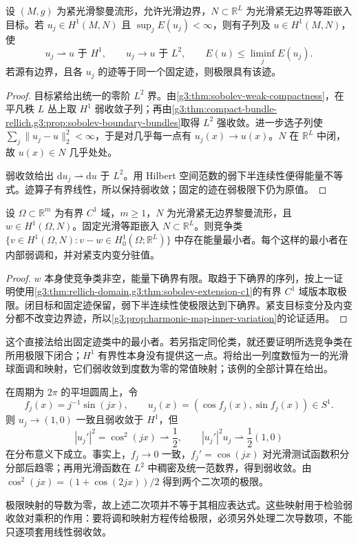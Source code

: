 \begin{theorem}\label{g3:thm:sobolev-map-weak-closure}
	设 \((M,g)\) 为紧光滑黎曼流形，允许光滑边界，\(N\subset\mathbb R^L\) 为光滑紧无边界等距嵌入目标。若 \(u_j\in H^1(M,N)\) 且 \(\sup_jE(u_j)<\infty\)，则有子列及 \(u\in H^1(M,N)\)，使
	\[
		u_j\rightharpoonup u\text{ 于 }H^1,
		\qquad u_j\to u\text{ 于 }L^2,
		\qquad E(u)\le\liminf_jE(u_j).
	\]
	若源有边界，且各 \(u_j\) 的迹等于同一个固定迹，则极限具有该迹。
\end{theorem}
\begin{proof}
	目标紧给出统一的零阶 \(L^2\) 界。由\cref{g3:thm:sobolev-weak-compactness}，在平凡秩 \(L\) 丛上取 \(H^1\) 弱收敛子列；再由\cref{g3:thm:compact-bundle-rellich,g3:prop:sobolev-boundary-bundles}取得 \(L^2\) 强收敛。进一步选子列使 \(\sum_j\|u_j-u\|_2^2<\infty\)，于是对几乎每一点有 \(u_j(x)\to u(x)\)。\(N\) 在 \(\mathbb R^L\) 中闭，故 \(u(x)\in N\) 几乎处处。

	弱收敛给出 \(\mathrm du_j\rightharpoonup\mathrm du\) 于 \(L^2\)。用 Hilbert 空间范数的弱下半连续性便得能量不等式。迹算子有界线性，所以保持弱收敛；固定的迹在弱极限下仍为原值。
\end{proof}

\begin{corollary}\label{g3:cor:harmonic-map-dirichlet-minimizer}
	设 \(\Omega\subset\mathbb R^m\) 为有界 \(C^1\) 域，\(m\ge1\)，\(N\) 为光滑紧无边界黎曼流形，且 \(w\in H^1(\Omega,N)\)。固定光滑等距嵌入 \(N\subset\mathbb R^L\)。则竞争类 \(\{v\in H^1(\Omega,N):v-w\in H^1_0(\Omega;\mathbb R^L)\}\) 中存在能量最小者。每个这样的最小者在内部弱调和，并对紧支内变分驻值。
\end{corollary}
\begin{proof}
	\(w\) 本身使竞争类非空，能量下确界有限。取趋于下确界的序列，按上一证明使用\cref{g3:thm:rellich-domain,g3:thm:sobolev-extension-c1}的有界 \(C^1\) 域版本取极限。闭目标和固定迹保留，弱下半连续性使极限达到下确界。紧支目标变分及内变分都不改变边界迹，所以\cref{g3:prop:harmonic-map-inner-variation}的论证适用。
\end{proof}

这个直接法给出固定迹类中的最小者。若另指定同伦类，就还要证明所选竞争类在所用极限下闭合；\(H^1\) 有界性本身没有提供这一点。将给出一列度数恒为一的光滑球面调和映射，它们弱收敛到度数为零的常值映射；该例的全部计算在给出。

\begin{example}\label{g3:exm:weak-map-quadratic-defect}
	在周期为 \(2\pi\) 的平坦圆周上，令
	\[
		f_j(x)=j^{-1}\sin(jx),\qquad u_j(x)=(\cos f_j(x),\sin f_j(x))\in S^1.
	\]
	则 \(u_j\to(1,0)\) 一致且弱收敛于 \(H^1\)，但
	\[
		|u_j'|^2=\cos^2(jx)\rightharpoonup\frac12,
		\qquad |u_j'|^2u_j\rightharpoonup\frac12(1,0)
	\]
	在分布意义下成立。事实上，\(f_j\to0\) 一致，\(f_j'=\cos(jx)\) 对光滑测试函数积分分部后趋零；再用光滑函数在 \(L^2\) 中稠密及统一范数界，得到弱收敛。由 \(\cos^2(jx)=(1+\cos(2jx))/2\) 得到两个二次项的极限。

	极限映射的导数为零，故上述二次项并不等于其相应表达式。这些映射用于检验弱收敛对乘积的作用：要将调和映射方程传给极限，必须另外处理二次导数项，不能只逐项套用线性弱收敛。
\end{example}

